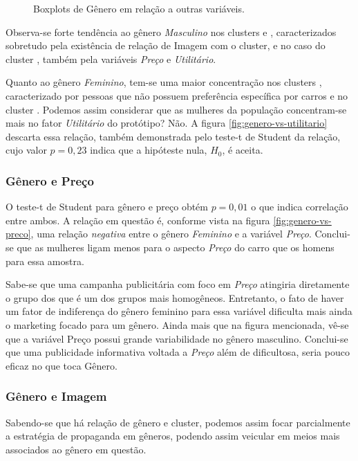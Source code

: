 \begin{figure}[h]
\begin{centering}
{}
\par\end{centering}

\caption{Boxplots de Gênero em relação a outras variáveis.}
\end{figure}

Observa-se forte tendência ao gênero \emph{Masculino }nos clusters
\nomeCa{} e \nomeCb{}, caracterizados sobretudo pela existência
de relação de Imagem com o cluster, e no caso do cluster \nomeCa{},
também pela variáveis \emph{Preço} e \emph{Utilitário}.

Quanto ao gênero \emph{Feminino}, tem-se uma maior concentração nos
clusters \nomeCc{}, caracterizado por pessoas que não possuem preferência
específica por carros e no cluster \nomeCd{}. Podemos assim considerar
que as mulheres da população concentram-se mais no fator \emph{Utilitário
}do protótipo? Não. A figura \ref{fig:genero-vs-utilitario} descarta
essa relação, também demonstrada pelo teste-t de Student da relação,
cujo valor $p=0,23$ indica que a hipóteste nula, $H_{0}$, é aceita.


\subsubsection{Gênero e Preço}

O teste-t de Student para gênero e preço obtém $p=0,01$ o que indica
correlação entre ambos. A relação em questão é, conforme vista na
figura \ref{fig:genero-vs-preco}, uma relação \emph{negativa} entre
o gênero \emph{Feminino }e a variável \emph{Preço}. Conclui-se que
as mulheres ligam menos para o aspecto \emph{Preço }do carro que os
homens para essa amostra. 

Sabe-se que uma campanha publicitária com foco em \emph{Preço} atingiria
diretamente o grupo dos \emph{\nomeCc{} }que é um dos grupos mais
homogêneos. Entretanto, o fato de haver um fator de indiferença do
gênero feminino para essa variável dificulta mais ainda o marketing
focado para um gênero. Ainda mais que na figura mencionada, vê-se
que a variável Preço possui grande variabilidade no gênero masculino.
Conclui-se que uma publicidade informativa voltada a \emph{Preço }além
de dificultosa, seria pouco eficaz no que toca Gênero.


\subsubsection{Gênero e Imagem}

Sabendo-se que há relação de gênero e cluster, podemos assim focar
parcialmente a estratégia de propaganda em gêneros, podendo assim
veicular em meios mais associados ao gênero em questão. 

